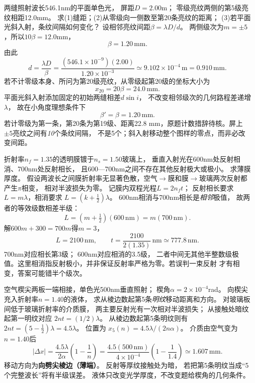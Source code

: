 \problemtext 两缝照射波长546.1nm的平面单色光，
屏距$D=2.00$m；
零级亮纹两侧的第5级亮纹相距12.0mm。
求(1)缝距；(2)从零级向一侧数至第20条亮纹的距离；
(3)若平面光斜入射，条纹间隔如何变化？
\workings
设相邻亮纹间距$\beta=\lambda D/d$。
两侧级次为$m=\pm5$，所以$10\beta=12.0$mm，
\[
\beta=1.20\,\mathrm{mm}.
\]
由此
\[
\boxed{d=\frac{\lambda D}{\beta}
=\frac{(546.1\times10^{-9})(2.00)}
{1.20\times10^{-3}}
\simeq9.102\times10^{-4}\,\mathrm m=0.910\,\mathrm{mm}}.
\]
若不计零级本身、所问为第20级亮纹，从零级起第20级的坐标大小为
\[
\boxed{x_{20}=20\beta=24.0\,\mathrm{mm}}.
\]
平面光斜入射添加固定的初始两缝相差$d\sin i$，
不改变相邻级次的几何路程差递增$\lambda$，
故在小角度理想条件下
\[
\boxed{\beta'=\beta=1.20\,\mathrm{mm}}.
\]
\crosscheck 若计零级为第一条，第20条为第19级、距离22.8 mm，原题计数措辞待核。屏上$\pm5$亮纹之间有\emph{10}个条纹间隔，
不是5个；斜入射移动整个图样的零点，而非必改变间距。

\problemtext 折射率$n_f=1.35$的透明膜镀于$n_s=1.50$玻璃上，
垂直入射光在600nm处反射相消、700nm处反射相长，
且600—700nm之间不存在其他反射极大或极小。
求薄膜厚度。
\workings
假设两波长之间膜折射率无显著色散，空气$\to$膜和膜$\to$玻璃两次反射都产生$\pi$相变，
相对半波损失为零。
记膜内双程光程$L=2n_ft$；
反射相长要求$L=m\lambda$，相消要求
$L=(k+\tfrac12)\lambda$。
600nm相消与700nm相长是\emph{相邻}极值，
故两者的等效级数相差半级：
\[
 L=(m+\tfrac12)(600\,\mathrm{nm})
 =m(700\,\mathrm{nm}).
\]
解$600m+300=700m$得$m=3$，
\[
\boxed{L=2100\,\mathrm{nm}},\qquad
\boxed{t=\frac{2100}{2(1.35)}\,\mathrm{nm}
\simeq777.8\,\mathrm{nm}}.
\]
\crosscheck 700nm对应相长第3级；
600nm对应相消的3.5级，
二者中间无其他半整数级极值。这里相消指反射极小，并非保证反射率严格为零。若误判一束反射
才有相变，答案可能错半个级次。

\problemtext 空气楔尖两板一端相接，单色光500nm垂直照射；
楔角$\alpha=2\times10^{-4}$rad。
向楔尖充入折射率$n=1.40$的液体，
求从棱边数起第5条\emph{明纹}移动距离和方向。
\workings
对玻璃板间低于玻璃折射率的介质膜，
两主要反射光有一次相对半波损失；
从接触处暗纹起第一明纹对应
$2nt=(1/2)\lambda$。
从棱边数起第5条明纹则有
$2nt=(5-\tfrac12)\lambda=4.5\lambda$。
位置为
$x_5(n)=4.5\lambda/(2n\alpha)$。
介质由空气变为$n=1.40$后
\[
\boxed{|\Delta x|
=\frac{4.5\lambda}{2\alpha}\left(1-\frac1n\right)
=\frac{4.5(500\,\mathrm{nm})}{4\times10^{-4}}
 \left(1-\frac1{1.4}\right)
\simeq1.607\,\mathrm{mm}}.
\]
移动方向为\textbf{向劈尖棱边（薄端）}。
\crosscheck 反射等厚纹接触处为暗，
若把第5条明纹当成“5个完整波长”将有半级误差。
液体只改变光学厚度，不改变题给楔角的几何条件。

